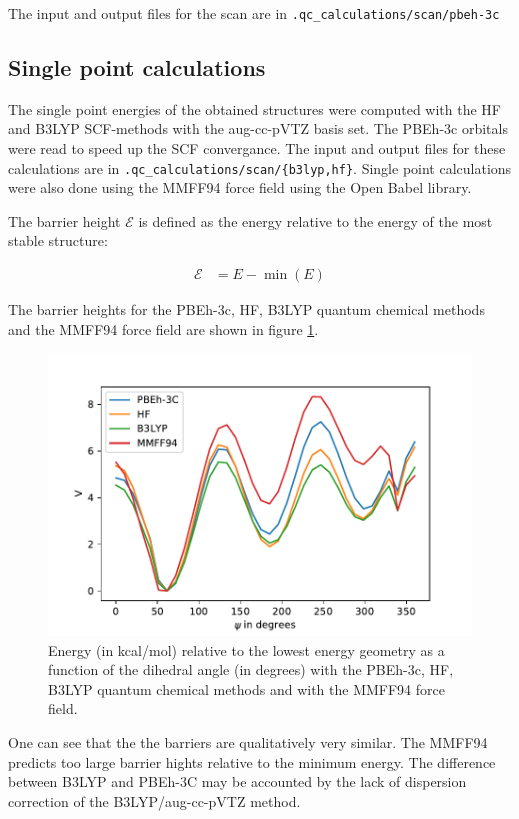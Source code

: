 \documentclass[10pt]{article}
\begin{document}
The input and output files for the scan are in \texttt{.qc\_calculations/scan/pbeh-3c}

\subsection{Single point calculations}


The single point energies of the obtained structures were computed with the HF and B3LYP\cite{b3lyp1, b3lyp2} SCF-methods with the aug-cc-pVTZ\cite{augccpvtz} basis set. The PBEh-3c orbitals were read to speed up the SCF convergance. The input and output files for these calculations are in \texttt{.qc\_calculations/scan/\{b3lyp,hf\}}. Single point calculations were also done using the MMFF94\cite{mmff94} force field using the Open Babel library\cite{openbabel}.

The barrier height $\mathcal{E}$ is defined as the energy relative to the energy of the most stable structure:

\begin{align}
\mathcal{E} &= E - \min (E)
\end{align}

The barrier heights for the PBEh-3c, HF, B3LYP quantum chemical methods and the MMFF94 force field are shown in figure \ref{fig:scan}.

\begin{figure}[ht!]
\centering
\includegraphics[width=0.7\linewidth]{fig/scan}
\caption{Energy (in kcal/mol) relative to the lowest energy geometry as a function of the dihedral angle (in degrees) with the PBEh-3c, HF, B3LYP quantum chemical methods and with the MMFF94 force field.}
\label{fig:scan}
\end{figure}

One can see that the the barriers are qualitatively very similar. The MMFF94 predicts too large barrier hights relative to the minimum energy. The difference between B3LYP and PBEh-3C may be accounted by the lack of dispersion correction of the B3LYP/aug-cc-pVTZ method.
\end{document}
